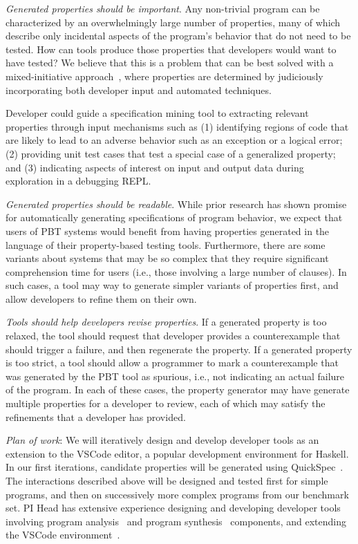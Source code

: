 \textit{Generated properties should be \emph{important}}. Any non-trivial program can be characterized by an overwhelmingly large number of properties, many of which describe only incidental aspects of the program's behavior that do not need to be tested. How can tools produce those properties that developers would want to have tested? We believe that this is a problem that can be best solved with a mixed-initiative approach~\cite{allen1999mixed}, where properties are determined by judiciously incorporating both developer input and automated techniques.

Developer could guide a specification mining tool to extracting relevant properties through input mechanisms such as (1) identifying regions of code that are likely to lead to an adverse behavior such as an exception or a logical error; (2) providing unit test cases that test a special case of a generalized property; and (3) indicating aspects of interest on input and output data during exploration in a debugging REPL.

\textit{Generated properties should be \emph{readable}}. While prior research has shown promise for automatically generating specifications of program behavior, we expect that users of PBT systems would benefit from having properties generated in the language of their property-based testing tools. Furthermore, there are some variants about systems that may be so complex that they require significant comprehension time for users (i.e., those involving a large number of clauses). In such cases, a tool may way to generate simpler variants of properties first, and allow developers to refine them on their own.

\textit{Tools should help developers \emph{revise} properties}. If a generated property is too relaxed, the tool should request that developer provides a counterexample that should trigger a failure, and then regenerate the property. If a generated property is too strict, a tool should allow a programmer to mark a counterexample that was generated by the PBT tool as spurious, i.e., not indicating an actual failure of the program. In each of these cases, the property generator may have generate multiple properties for a developer to review, each of which may satisfy the refinements that a developer has provided.

\textit{Plan of work}: We will iteratively design and develop developer tools as an extension to the VSCode editor, a popular development environment for Haskell. In our first iterations, candidate properties will be generated using QuickSpec~\cite{claessen2010quickspec}. The interactions described above will be designed and tested first for simple programs, and then on successively more complex programs from our benchmark set. PI Head has extensive experience designing and developing developer tools involving program analysis~\cite{head2018interactive,head2019managing} and program synthesis~\cite{head2017writing} components, and extending the VSCode environment~\cite{head2020composing}.  

